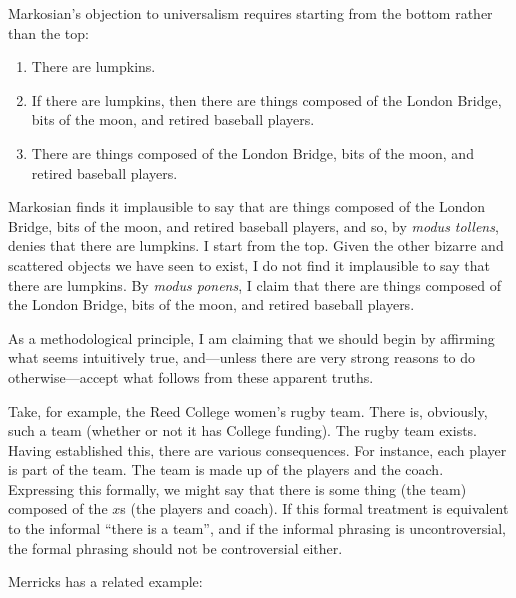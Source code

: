 \documentclass[11pt]{article}
\begin{document}
\begin{spacing}{1.25}
Markosian's objection to universalism requires starting from the
bottom rather than the top:

\begin{enumerate}
  \item There are lumpkins.
  \item If there are lumpkins, then there are things composed of the
    London Bridge, bits of the moon, and retired baseball players.
  \item There are things composed of the London Bridge, bits of the
    moon, and retired baseball players.
\end{enumerate}

Markosian finds it implausible to say that are things composed of the
London Bridge, bits of the moon, and retired baseball players, and so,
by {\em modus tollens}, denies that there are lumpkins.  I start from
the top.  Given the other bizarre and scattered objects we have seen
to exist, I do not find it implausible to say that there are lumpkins.
By {\em modus ponens}, I claim that there are things composed of the
London Bridge, bits of the moon, and retired baseball players.

As a methodological principle, I am claiming that we should begin by
affirming what seems intuitively true, and---unless there are very
strong reasons to do otherwise---accept what follows from these
apparent truths.

Take, for example, the Reed College women's rugby team.  There is,
obviously, such a team (whether or not it has College funding).  The
rugby team exists.  Having established this, there are various
consequences.  For instance, each player is part of the team.  The
team is made up of the players and the coach.  Expressing this
formally, we might say that there is some thing (the team) composed of
the $x$s (the players and coach).  If this formal treatment is
equivalent to the informal ``there is a team'', and if the informal
phrasing is uncontroversial, the formal phrasing should not be
controversial either.

Merricks has a related example:


\end{spacing}
\end{document}
